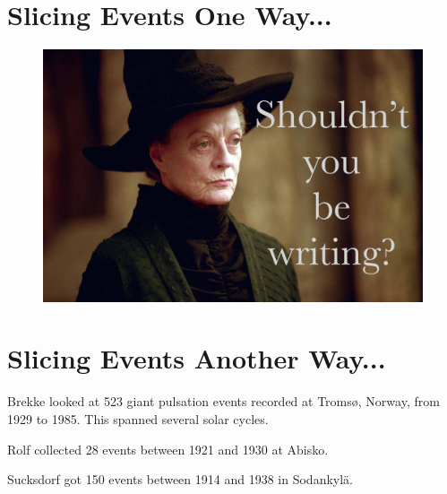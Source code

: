 \section{Slicing Events One Way...}

\begin{figure}[!htb]
    \centering
    \includegraphics[width=\textwidth]{figures/placeholder.jpg}
    \caption[Distribution of Events by Spectral Width]{
    }
    \label{fig_fwhm}
\end{figure}

\section{Slicing Events Another Way...}



Brekke\cite{brekke_1987} looked at 523 giant pulsation events recorded at Troms{\o}, Norway, from 1929 to 1985. This spanned several solar cycles. 

Rolf\cite{rolf_1931} collected 28 events between 1921 and 1930 at Abisko. 

Sucksdorf\cite{sucksdorff_1939} got 150 events between 1914 and 1938 in Sodankyl{\"a}. 

